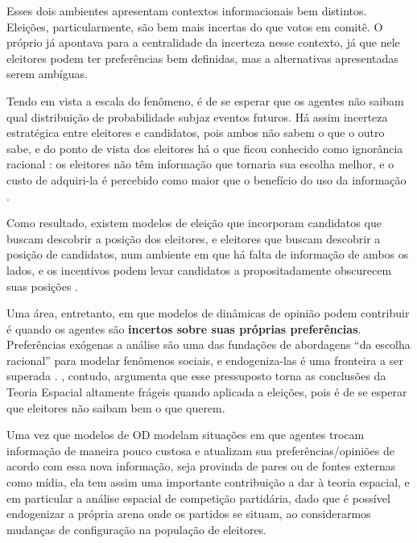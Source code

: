 Esses dois ambientes apresentam contextos informacionais bem distintos.
Eleições, particularmente, são bem mais incertas do que votos em comitê. O
próprio  já apontava para a centralidade da
incerteza nesse contexto, já que nele eleitores podem ter preferências bem
definidas, mas a alternativas apresentadas serem ambíguas.

Tendo em vista a  escala do fenômeno, é de se esperar que os agentes não saibam qual
distribuição de probabilidade subjaz eventos futuros. Há assim incerteza
estratégica entre eleitores e candidatos, pois ambos não sabem o que o outro
sabe, e do ponto de vista dos eleitores há o que ficou conhecido como ignorância
racional : os eleitores não têm informação que tornaria sua escolha melhor, e o
custo de adquiri-la é percebido como maior que o benefício do uso da informação
\cite{munger2015choosing}.

Como resultado, existem modelos de eleição que incorporam candidatos que buscam
descobrir a posição dos eleitores, e eleitores que buscam descobrir a posição de
candidatos, num ambiente em que há falta de informação de ambos os lados, e os
incentivos podem levar candidatos a propositadamente obscurecem suas posições
\cite{downs1957economic}.

Uma área, entretanto, em que modelos de dinâmicas de opinião podem contribuir é
quando os agentes são \textbf{incertos sobre suas próprias preferências}.
Preferências exógenas a análise são uma das fundações de abordagens ``da escolha
racional'' para modelar fenômenos sociais, e endogeniza-las é uma fronteira a
ser superada \cite{gintis2009bounds,bowles2009microeconomics}.
, contudo, argumenta que esse pressuposto torna
as conclusões da Teoria Espacial altamente frágeis quando aplicada a eleições,
pois é de se esperar que eleitores não saibam bem o que querem.

Uma vez que modelos de OD modelam situações em que agentes trocam informação de
maneira pouco custosa e atualizam sua preferências/opiniões de acordo com essa
nova informação, seja provinda de pares ou de fontes externas como mídia, ela
tem assim uma importante contribuição a dar à teoria espacial, e em particular a
análise espacial de competição partidária, dado que é possível endogenizar a
própria arena onde os partidos se situam, ao considerarmos mudanças de
configuração na população de eleitores.






